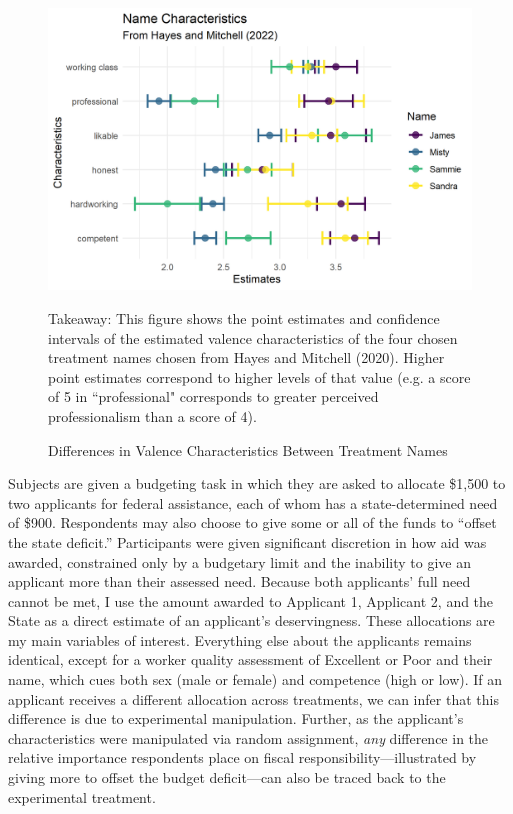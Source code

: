 \documentclass[12pt]{article}%
\begin{document}
\begin{doublespace}
\begin{figure}[h!]
	\centering
	\includegraphics[scale=1]{figs/characteristics.png}
	{\singlespacing
		\parbox{0.75\textwidth}{\scriptsize%
			Takeaway: This figure shows the point estimates and confidence intervals of the estimated valence characteristics of the four chosen treatment names chosen from Hayes and Mitchell (2020). Higher point estimates correspond to higher levels of that value (e.g. a score of 5 in ``professional" corresponds to greater perceived professionalism than a score of 4).
	}}
	\caption{Differences in Valence Characteristics Between Treatment Names}
	\label{characteristics}
\end{figure}

Subjects are given a budgeting task in which they are asked to allocate \$1,500 to two applicants for federal assistance, each of whom has a state-determined need of \$900. Respondents may also choose to give some or all of the funds to ``offset the state deficit.” Participants were given significant discretion in how aid was awarded, constrained only by a budgetary limit and the inability to give an applicant more than their assessed need. Because both applicants’ full need cannot be met, I use the amount awarded to Applicant 1, Applicant 2, and the State as a direct estimate of an applicant’s deservingness. These allocations are my main variables of interest. Everything else about the applicants remains identical, except for a worker quality assessment of Excellent or Poor and their name, which cues both sex (male or female) and competence (high or low). If an applicant receives a different allocation across treatments, we can infer that this difference is due to experimental manipulation. Further, as the applicant’s characteristics were manipulated via random assignment, \textit{any} difference in the relative importance respondents place on fiscal responsibility—illustrated by giving more to offset the budget deficit—can also be traced back to the experimental treatment. 


\end{doublespace}
\end{document}
